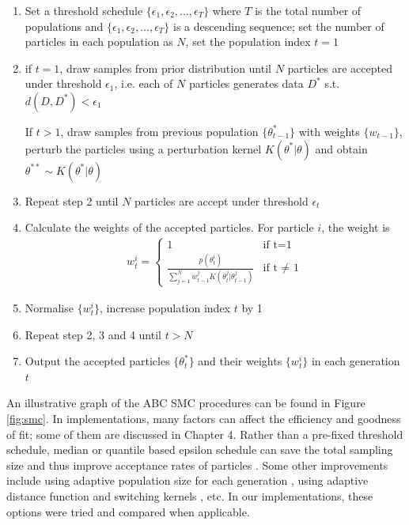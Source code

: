 \begin{enumerate}
    \item Set a threshold schedule $\{\epsilon_1, \epsilon_2, ..., \epsilon_T\}$ where $T$ is the total number of populations and $\{\epsilon_1, \epsilon_2, ..., \epsilon_T\}$ is a descending sequence; set the number of particles in each population as $N$, set the population index $t=1$
    \item if $t=1$, draw samples from prior distribution until $N$ particles are accepted under threshold $\epsilon_1$, i.e. each of $N$ particles generates data $D^*$ s.t. $d(D,D^*)<\epsilon_1$
    
    If $t>1$, draw samples from previous population $\{\theta^*_{t-1}\}$ with weights $\{w_{t-1}\}$, perturb the particles using a perturbation kernel $K(\theta^*|\theta)$ and obtain $\theta^{**}\sim K(\theta^*|\theta)$
    \item Repeat step 2 until $N$ particles are accept under threshold $\epsilon_t$
    \item Calculate the weights of the accepted particles. For particle $i$, the weight is 
    \begin{align}
        \label{eq:weight}
        w^i_t =\begin{cases}
            1 & \text{if t=1} \\
            \frac{p(\theta^i_t)}{\sum_{j=1}^{N} w^j_{t-1}K(\theta^j_t|\theta^j_{t-1})} & \text{if t $\neq$ 1} 
        \end{cases}
    \end{align}
    
    \item Normalise $\{w^i_t\}$, increase population index $t$ by 1
    \item Repeat step 2, 3 and 4 until $t>N$
    \item Output the accepted particles $\{\theta^*_{t}\}$ and their weights $\{w^i_t\}$ in each generation $t$

\end{enumerate}

An illustrative graph of the ABC SMC procedures can be found in Figure \ref{fig:smc}. In implementations, many factors can affect the efficiency and goodness of fit; some of them are discussed in Chapter 4. Rather than a pre-fixed threshold schedule, median or quantile based epsilon schedule can save the total sampling size and thus improve acceptance rates of particles \cite{threshold}. Some other improvements include using adaptive population size for each generation \cite{population}, using adaptive distance function \cite{ref:adpt_dis} and switching kernels \cite{ref:kernel}, etc. In our implementations, these options were tried and compared when applicable.

